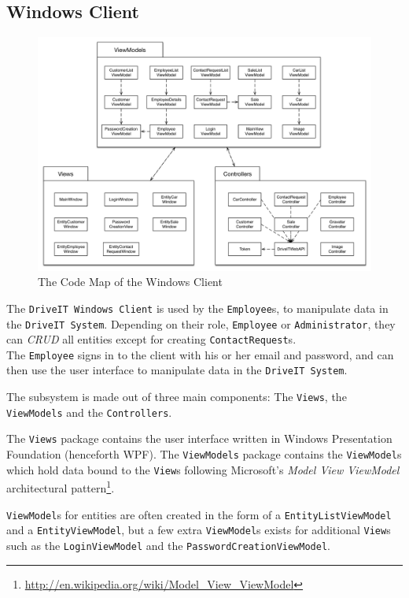 \subsection{Windows Client} 
\begin{figure}[H]
	\centering
	\includegraphics[width=\textwidth]{Figures/WindowsClientCodeMapProper}
	\caption{The Code Map of the Windows Client}
	\label{fig:WindowsClientCodeMap}
\end{figure}
The \texttt{DriveIT Windows Client} is used by the \texttt{Employee}s, to manipulate data in the \texttt{DriveIT System}. Depending on their role, \texttt{Employee} or \texttt{Administrator}, they can \textit{CRUD} all entities except for creating \texttt{ContactRequest}s.\\

The \texttt{Employee} signs in to the client with his or her email and password, and can then use the user interface to manipulate data in the \texttt{DriveIT System}.

The subsystem is made out of three main components: The \texttt{Views}, the \texttt{ViewModels} and the \texttt{Controllers}.

The \texttt{Views} package contains the user interface written in Windows Presentation Foundation (henceforth WPF). The \texttt{ViewModels} package contains the \texttt{ViewModel}s which hold data bound to the \texttt{View}s following Microsoft's \textit{Model View ViewModel} architectural pattern\footnote{\url{http://en.wikipedia.org/wiki/Model_View_ViewModel}}.

\texttt{ViewModel}s for entities are often created in the form of a \texttt{EntityListViewModel} and a \texttt{EntityViewModel}, but a few extra \texttt{ViewModel}s exists for additional \texttt{View}s such as the \texttt{LoginViewModel} and the \texttt{PasswordCreationViewModel}.

